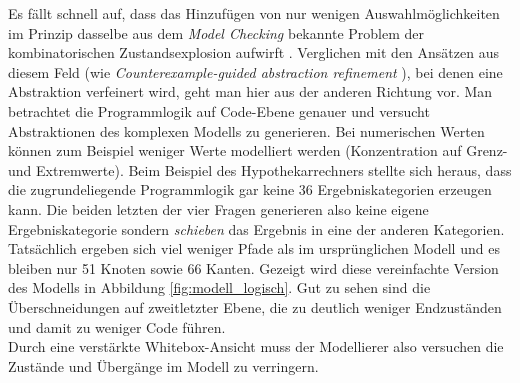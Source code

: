 Es fällt schnell auf, dass das Hinzufügen von nur wenigen Auswahlmöglichkeiten im Prinzip dasselbe aus dem \textit{Model Checking} bekannte Problem der kombinatorischen Zustandsexplosion aufwirft \cite{clarke_model_2012}. Verglichen mit den Ansätzen aus diesem Feld (wie \textit{Counterexample-guided abstraction refinement} \cite{clarke_counterexample-guided_2000}), bei denen eine Abstraktion verfeinert wird, geht man hier aus der anderen Richtung vor. Man betrachtet die Programmlogik auf Code-Ebene genauer und versucht Abstraktionen des komplexen Modells zu generieren. Bei numerischen Werten können zum Beispiel weniger Werte modelliert werden (Konzentration auf Grenz- und Extremwerte). Beim Beispiel des Hypothekarrechners stellte sich heraus, dass die zugrundeliegende Programmlogik gar keine 36 Ergebniskategorien erzeugen kann. Die beiden letzten der vier Fragen generieren also keine eigene Ergebniskategorie sondern \textit{schieben} das Ergebnis in eine der anderen Kategorien. Tatsächlich ergeben sich viel weniger Pfade als im ursprünglichen Modell und es bleiben nur 51 Knoten sowie 66 Kanten. Gezeigt wird diese vereinfachte Version des Modells in Abbildung \ref{fig:modell_logisch}. Gut zu sehen sind die Überschneidungen auf zweitletzter Ebene, die zu deutlich weniger Endzuständen und damit zu weniger Code führen.\\
Durch eine verstärkte Whitebox-Ansicht muss der Modellierer also versuchen die Zustände und Übergänge im Modell zu verringern.


